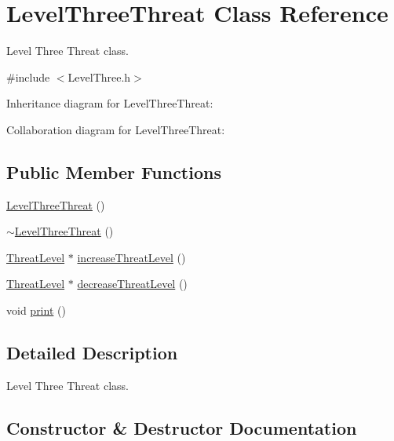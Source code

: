 \hypertarget{classLevelThreeThreat}{}\section{Level\+Three\+Threat Class Reference}
\label{classLevelThreeThreat}


Level Three Threat class.  




{\ttfamily \#include $<$Level\+Three.\+h$>$}



Inheritance diagram for Level\+Three\+Threat\+:


Collaboration diagram for Level\+Three\+Threat\+:
\subsection*{Public Member Functions}
\begin{DoxyCompactItemize}
\item 
\hyperlink{classLevelThreeThreat_a5c9b00bc5cd2459c7b1adf2542afc702}{Level\+Three\+Threat} ()
\item 
\hyperlink{classLevelThreeThreat_ab5caa48c8913099e0a3520ce6849b295}{$\sim$\+Level\+Three\+Threat} ()
\item 
\hyperlink{classThreatLevel}{Threat\+Level} $\ast$ \hyperlink{classLevelThreeThreat_a284c2b79a9a85f5e164f15c258c6e9ca}{increase\+Threat\+Level} ()
\item 
\hyperlink{classThreatLevel}{Threat\+Level} $\ast$ \hyperlink{classLevelThreeThreat_a98337ab08fe61b136d9c9e48f7ace804}{decrease\+Threat\+Level} ()
\item 
void \hyperlink{classLevelThreeThreat_a3bdd7e61f3938123ce9c705623e0d98a}{print} ()
\end{DoxyCompactItemize}


\subsection{Detailed Description}
Level Three Threat class. 

\subsection{Constructor \& Destructor Documentation}
\mbox{\label{classLevelThreeThreat_a5c9b00bc5cd2459c7b1adf2542afc702}} 
